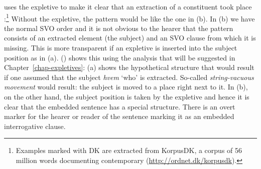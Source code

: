 \largerpage
\noindent
{} uses the expletive to make it clear that an extraction of a constituent took place 
\citep[]{MOe2011a}:\footnote{
  Examples marked with DK are extracted from KorpusDK, a corpus of 56 million words documenting
  contemporary  (\url{http://ordnet.dk/korpusdk}).
}
\eal
{}
\zl
Without the expletive, the pattern would be like the one in (b). In (b) we have the
normal SVO order and it is not obvious to the hearer that the pattern consists of an extracted
element (the subject) and an SVO clause from which it is missing. This is more transparent if an
expletive is inserted into the subject position as in (a). () shows this using the
analysis that will be suggested in Chapter~\ref{chap-expletives}: (a) shows the hypothetical
structure that would result if one assumed that the subject \emph{hvem} `who' is
extracted. So-called \emph{string-vacuous movement} would result: the subject is moved to a place
right next to it. In (b), on the other hand, the subject position is taken by the expletive and
hence it is clear that the embedded sentence has a special structure. There is an overt marker for
the hearer or reader of the sentence marking it as an embedded interrogative clause.
\eal
{}
\zl

